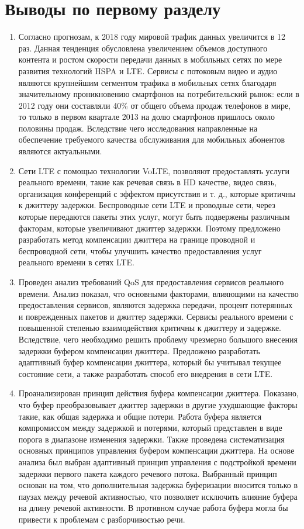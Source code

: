 \section{Выводы по первому разделу } \label{sect1_conclus}

\begin{enumerate}
\item Согласно прогнозам, к 2018 году мировой трафик данных увеличится в 12 раз. Данная тенденция обусловлена увеличением объемов доступного контента и ростом скорости передачи данных в мобильных сетях по мере развития технологий HSPA и LTE.
Сервисы с потоковым видео и аудио являются крупнейшим сегментом трафика в мобильных сетях благодаря значительному проникновению смартфонов на потребительский рынок:
если в 2012 году они составляли 40\% от общего объема продаж телефонов в мире, то только в первом квартале 2013 на долю смартфонов пришлось около половины продаж.
Вследствие чего исследования направленные на обеспечение требуемого качества обслуживания для мобильных абонентов являются актуальными.
\item Сети LTE с помощью технологии VoLTE, позволяют предоставлять услуги реального времени, 
такие как речевая связь в HD качестве, видео связь, организация конференций с эффектом присутствия и т. д., которые критичны к джиттеру задержки. 
Беспроводные сети LTE и проводные сети, через которые передаются пакеты этих услуг, могут быть подвержены различным факторам, которые увеличивают джиттер задержки. 
Поэтому предложено разработать метод компенсации джиттера на границе проводной и беспроводной сети, чтобы улучшить качество предоставления услуг реального времени в сетях LTE.

\item Проведен анализ требований QoS для предоставления сервисов реального времени.
Анализ показал, что основными факторами, влияющими на качество предоставления сервисов, являются задержка передачи, процент потерянных и поврежденных пакетов и джиттер задержки.
Сервисы реального времени с повышенной степенью взаимодействия критичны к джиттеру и задержке. Вследствие, чего необходимо решить проблему чрезмерно большого внесения задержки буфером компенсации джиттера. 
Предложено разработать адаптивный буфер компенсации джиттера, который бы учитывал текущее состояние сети, а также разработать способ его внедрения  в сети LTE.
\item Проанализирован принцип действия буфера компенсации джиттера. 
Показано, что буфер преобразовывает джиттер задержки в другие ухудшающие факторы такие, как общая задержка и общие потери. 
Работа буфера является компромиссом между задержкой и потерями, который представлен в виде порога в диапазоне изменения задержки.
Также проведена систематизация основных принципов управления буфером компенсации джиттера. 
На основе анализа был выбран адаптивный принцип управления с подстройкой времени задержки первого пакета каждого речевого потока. 
Выбранный принцип основан на том, что дополнительная задержка буферизации вносится только в паузах между речевой активностью, что позволяет исключить влияние буфера на длину речевой активности.
В противном случае работа буфера могла бы привести к проблемам с разборчивостью речи.


\end{enumerate}

\clearpage




